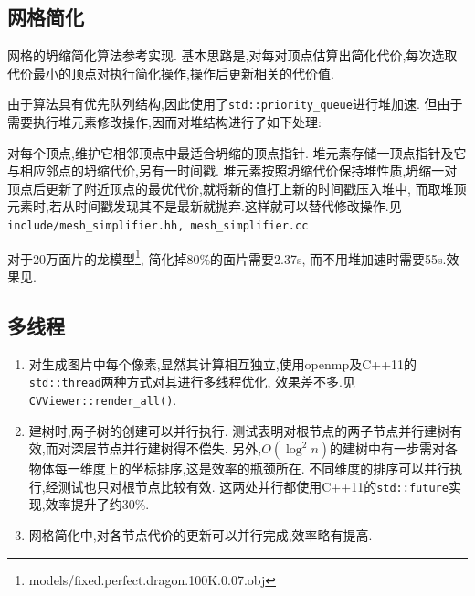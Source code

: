 \subsection{网格简化}
网格的坍缩简化算法参考\cite{mesh}实现.
基本思路是,对每对顶点估算出简化代价,每次选取代价最小的顶点对执行简化操作,操作后更新相关的代价值.

由于算法具有优先队列结构,因此使用了\verb|std::priority_queue|进行堆加速.
但由于需要执行堆元素修改操作,因而对堆结构进行了如下处理:

对每个顶点,维护它相邻顶点中最适合坍缩的顶点指针.
堆元素存储一顶点指针及它与相应邻点的坍缩代价,另有一时间戳.
堆元素按照坍缩代价保持堆性质,坍缩一对顶点后更新了附近顶点的最优代价,就将新的值打上新的时间戳压入堆中,
而取堆顶元素时,若从时间戳发现其不是最新就抛弃.这样就可以替代修改操作.见\verb|include/mesh_simplifier.hh, mesh_simplifier.cc|

对于20万面片的龙模型\footnote{models/fixed.perfect.dragon.100K.0.07.obj},
简化掉80\%的面片需要2.37s, 而不用堆加速时需要55s.效果见.

\subsection{多线程}
\begin{enumerate}
  \item 对生成图片中每个像素,显然其计算相互独立,使用openmp及C++11的\verb|std::thread|两种方式对其进行多线程优化,
    效果差不多.见\verb|CVViewer::render_all()|.

  \item 建树时,两子树的创建可以并行执行.
    测试表明对根节点的两子节点并行建树有效,而对深层节点并行建树得不偿失.
    另外,$O(\log^2 n)$的建树中有一步需对各物体每一维度上的坐标排序,这是效率的瓶颈所在.
    不同维度的排序可以并行执行,经测试也只对根节点比较有效.
    这两处并行都使用C++11的\verb|std::future|实现,效率提升了约30\%.

  \item 网格简化中,对各节点代价的更新可以并行完成,效率略有提高.
\end{enumerate}
